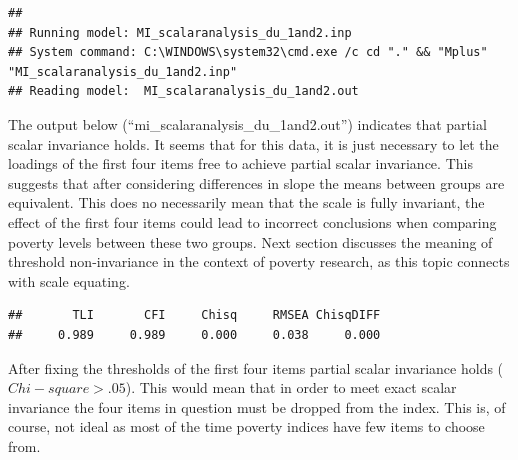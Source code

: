\documentclass[]{book}
\newenvironment{Shaded}{\begin{snugshade}}{\end{snugshade}}
\newcommand{\DataTypeTok}[1]{\textcolor[rgb]{0.13,0.29,0.53}{#1}}
\newcommand{\KeywordTok}[1]{\textcolor[rgb]{0.13,0.29,0.53}{\textbf{#1}}}
\newcommand{\NormalTok}[1]{#1}
\newcommand{\OperatorTok}[1]{\textcolor[rgb]{0.81,0.36,0.00}{\textbf{#1}}}
\begin{document}
\begin{verbatim}
## 
## Running model: MI_scalaranalysis_du_1and2.inp 
## System command: C:\WINDOWS\system32\cmd.exe /c cd "." && "Mplus" "MI_scalaranalysis_du_1and2.inp" 
## Reading model:  MI_scalaranalysis_du_1and2.out
\end{verbatim}

The output below (``mi\_scalaranalysis\_du\_1and2.out'') indicates that partial scalar invariance holds. It seems that for this data, it is just necessary to let the loadings of the first four items free to achieve partial scalar invariance. This suggests that after considering differences in slope the means between groups are equivalent. This does no necessarily mean that the scale is fully invariant, the effect of the first four items could lead to incorrect conclusions when comparing poverty levels between these two groups. Next section discusses the meaning of threshold non-invariance in the context of poverty research, as this topic connects with scale equating.

\begin{Shaded}
\end{Shaded}

\begin{verbatim}
##       TLI       CFI     Chisq     RMSEA ChisqDIFF 
##     0.989     0.989     0.000     0.038     0.000
\end{verbatim}

After fixing the thresholds of the first four items partial scalar invariance holds (\(Chi-square>.05\)). This would mean that in order to meet exact scalar invariance the four items in question must be dropped from the index. This is, of course, not ideal as most of the time poverty indices have few items to choose from.
\end{document}
